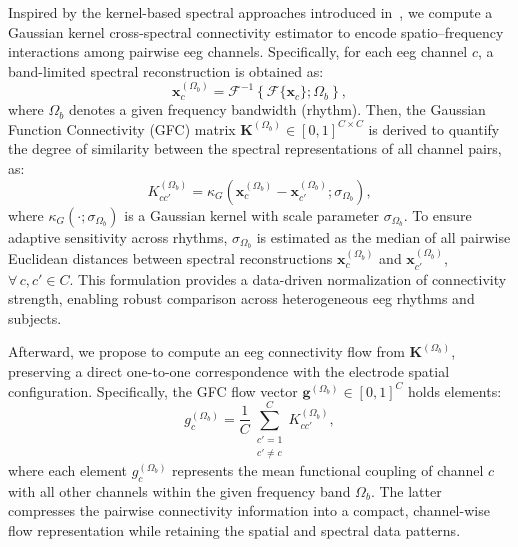 Inspired by the kernel-based spectral approaches introduced in~\cite{diagnostics13061122}, we compute a Gaussian kernel cross-spectral connectivity estimator to encode spatio--frequency interactions among pairwise \gls{eeg} channels. Specifically, for each \gls{eeg} channel \( c \), a band-limited spectral reconstruction is obtained as:
\begin{equation}\label{eq:fbank}
\mathbf{x}_c^{({\Omega_b})} = 
\mathcal{F}^{-1}\left\{\mathcal{F}\{\mathbf{x}_c\}; {\Omega_b}\right\},
\end{equation}
where \( {\Omega_b} \) denotes a given frequency bandwidth (rhythm). 
Then, the Gaussian Function Connectivity (GFC) matrix 
\( \mathbf{K}^{({\Omega_b})} \in [0,1]^{C\times C} \) is derived to quantify 
the degree of similarity between the spectral representations of all channel pairs, as:
\begin{equation}
K^{({\Omega_b})}_{cc'} = 
\kappa_G\left(\mathbf{x}^{({\Omega_b})}_c - \mathbf{x}^{({\Omega_b})}_{c'}; 
\sigma_{{\Omega_b}}\right),
\label{eq:gfc}
\end{equation}
where \( \kappa_G(\cdot; \sigma_{{\Omega_b}}) \) is a Gaussian kernel with scale parameter \( \sigma_{{\Omega_b}} \). To ensure adaptive sensitivity across rhythms, \( \sigma_{{\Omega_b}} \) is estimated as the 
median of all pairwise Euclidean distances between spectral reconstructions 
\( \mathbf{x}^{({\Omega_b})}_c \) and \( \mathbf{x}^{({\Omega_b})}_{c'} \), \( \forall\, c,c'\in C \). This formulation provides a data-driven normalization of connectivity strength, enabling robust comparison across heterogeneous \gls{eeg} rhythms and subjects.

Afterward, we propose to compute an \gls{eeg} connectivity flow from 
\(\mathbf{K}^{({\Omega_b})}\), preserving a direct one-to-one correspondence 
with the electrode spatial configuration. Specifically, the GFC flow vector \(\mathbf{g}^{({\Omega_b})} \in [0,1]^C\) holds elements:
\begin{equation}\label{eq:flowGFC}
g_c^{({\Omega_b})} = 
\frac{1}{C} \sum_{\substack{c'=1 \\ c' \neq c}}^{C} 
K^{({\Omega_b})}_{cc'},
\end{equation}
where each element \( g_c^{({\Omega_b})} \) represents the mean functional coupling of channel \( c \) with all other channels within the given frequency band \({\Omega_b} \). The latter compresses the pairwise connectivity information into a compact, channel-wise flow representation while retaining the spatial and spectral data patterns.

